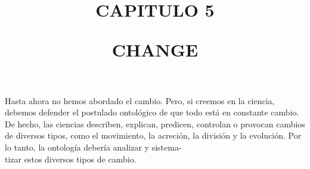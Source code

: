 \documentclass[11pt]{article}
\title{
  \normalsize CAPITULO 5
  \vspace{0.8cm}
  \begin{center}
    \large CHANGE
  \end{center}
  }
\date{}
\begin{document}
\maketitle
\vspace{-1cm}

\begin{justifying}
  \noindent 
  Hasta ahora no hemos abordado el cambio. Pero, si creemos en la ciencia, debemos defender el postulado ontológico de que todo 
  está en constante cambio. De hecho, las ciencias describen, explican, predicen, 
  controlan o provocan cambios de diversos tipos, como el movimiento, la acreción, 
  la división y la evolución. Por lo tanto, la ontología debería analizar y sistema- \\ tizar estos diversos tipos de cambio.


\end{justifying}










\printbibliography
\end{document}
